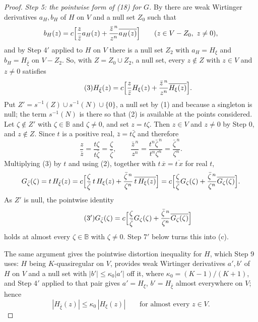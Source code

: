 \begin{proof}
\emph{Step 5: the pointwise form of (18) for $G$.}  By 
there are weak Wirtinger derivatives $a_H,b_H$ of $H$ on $V$ and a null set
$Z_0$ such that
\[
  b_H(z)=c\Bigl[\frac{z}{\bar z}a_H(z)
    +\frac{\bar z^{\,n}}{z^{n}}\overline{a_H(z)}\Bigr]
  \qquad(z\in V-Z_0,\ z\neq0),
\]
and by Step 4$'$ applied to $H$ on $V$ there is a null set $Z_2$ with
$a_H=H_\xi$ and $b_H=H_{\bar\xi}$ on $V-Z_2$.  So, with $Z=Z_0\cup Z_2$, a
null set, every $z\notin Z$ with $z\in V$ and $z\neq0$ satisfies
\begin{equation}\tag{3}
  H_{\bar\xi}(z)=c\Bigl[\frac{z}{\bar z}H_\xi(z)
    +\frac{\bar z^{\,n}}{z^{n}}\overline{H_\xi(z)}\Bigr].
\end{equation}
Put $Z'=s^{-1}(Z)\cup s^{-1}(N)\cup\{0\}$, a null set by (1) and because a
singleton is null; the term $s^{-1}(N)$ is there so that (2) is available at the
points considered.
Let $\zeta\notin Z'$ with $\zeta\in\mathbb{B}$ and $\zeta\neq0$, and set
$z=t\zeta$.  Then $z\in V$ and $z\neq0$ by Step 0, and $z\notin Z$.  Since $t$
is a positive real, $\bar z=t\bar\zeta$ and therefore
\[
  \frac{z}{\bar z}=\frac{t\zeta}{t\bar\zeta}=\frac{\zeta}{\bar\zeta},
  \qquad
  \frac{\bar z^{\,n}}{z^{n}}
    =\frac{t^{n}\bar\zeta^{\,n}}{t^{n}\zeta^{n}}
    =\frac{\bar\zeta^{\,n}}{\zeta^{n}} .
\]
Multiplying (3) by $t$ and using (2), together with $t\,\overline{x}=\overline{t\,x}$
for real $t$,
\[
  G_{\bar\zeta}(\zeta)=t\,H_{\bar\xi}(z)
  =c\Bigl[\frac{\zeta}{\bar\zeta}\,t\,H_\xi(z)
    +\frac{\bar\zeta^{\,n}}{\zeta^{n}}\,\overline{t\,H_\xi(z)}\Bigr]
  =c\Bigl[\frac{\zeta}{\bar\zeta}G_\zeta(\zeta)
    +\frac{\bar\zeta^{\,n}}{\zeta^{n}}\overline{G_\zeta(\zeta)}\Bigr].
\]
As $Z'$ is null, the pointwise identity
\begin{equation}\tag{3$'$}
  G_{\bar\zeta}(\zeta)=c\Bigl[\frac{\zeta}{\bar\zeta}G_\zeta(\zeta)
    +\frac{\bar\zeta^{\,n}}{\zeta^{n}}\overline{G_\zeta(\zeta)}\Bigr]
\end{equation}
holds at almost every $\zeta\in\mathbb{B}$ with $\zeta\neq0$.  Step 7$'$ below
turns this into (c).

The same argument gives the pointwise distortion inequality for $H$, which
Step 9 uses: $H$ being $K$-quasiregular on $V$, 
provides weak Wirtinger derivatives $a',b'$ of $H$ on $V$ and a null set with
$|b'|\le\kappa_0|a'|$ off it, where $\kappa_0=(K-1)/(K+1)$, and Step 4$'$
applied to that pair gives $a'=H_\xi$, $b'=H_{\bar\xi}$ almost everywhere on
$V$; hence
\begin{equation}\tag{3$''$}
  |H_{\bar\xi}(z)|\le\kappa_0\,|H_\xi(z)|\qquad\text{for almost every }z\in V .
\end{equation}


\end{proof}
